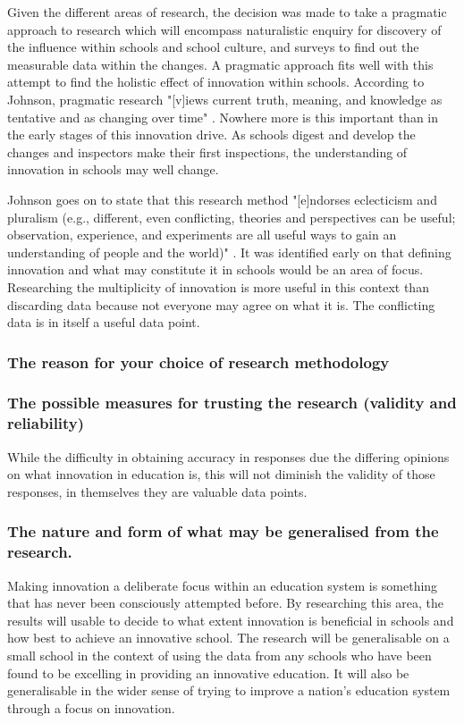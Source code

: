 Given the different areas of research, the decision was made to take a pragmatic approach to research which will encompass naturalistic enquiry for discovery of the influence within schools and school culture, and surveys to find out the measurable data within the changes.  A pragmatic approach fits well with this attempt to find the holistic effect of innovation within schools. According to Johnson, pragmatic research "[v]iews current truth, meaning, and knowledge as tentative and as changing over time" \cite[p. 18]{Johnson_2004}. Nowhere more is this important than in the early stages of this innovation drive. As schools digest and develop the changes and inspectors make their first inspections, the understanding of innovation in schools may well change.

Johnson goes on to state that this research method "[e]ndorses eclecticism and pluralism (e.g., different, even conflicting, theories and perspectives can be useful; observation, experience, and experiments are all useful ways to gain an understanding of people and the world)" \cite[p. 18]{Johnson_2004}. It was identified early on that defining innovation and what may constitute it in schools would be an area of focus. Researching the multiplicity of innovation is more useful in this context than discarding data because not everyone may agree on what it is. The conflicting data is in itself a useful data point.


\subsubsection{The reason for your choice of research methodology}



\subsubsection{The possible measures for trusting the research (validity and reliability)}
While the difficulty in obtaining accuracy in responses due the differing opinions on what innovation in education is, this will not diminish the validity of those responses, in themselves they are valuable data points. 

\subsubsection{The nature and form of what may be generalised from the research.}
Making innovation a deliberate focus within an education system is something that has never been consciously attempted before. By researching this area, the results will usable to decide to what extent innovation is beneficial in schools and how best to achieve an innovative school. The research will be generalisable on a small school in the context of using the data from any schools who have been found to be excelling in providing an innovative education. It will also be generalisable in the wider sense of trying to improve a nation's education system through a focus on innovation. 


